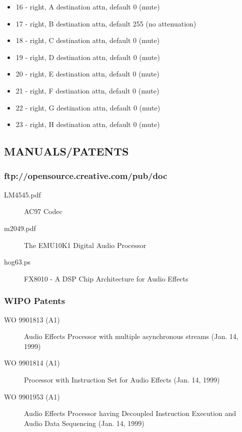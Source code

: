 \documentclass[a4paper,8pt,english]{sphinxmanual}
\begin{document}
\begin{itemize}
\item {} 
16 - right, A destination attn, default 0 (mute)

\item {} 
17 - right, B destination attn, default 255 (no attenuation)

\item {} 
18 - right, C destination attn, default 0 (mute)

\item {} 
19 - right, D destination attn, default 0 (mute)

\item {} 
20 - right, E destination attn, default 0 (mute)

\item {} 
21 - right, F destination attn, default 0 (mute)

\item {} 
22 - right, G destination attn, default 0 (mute)

\item {} 
23 - right, H destination attn, default 0 (mute)

\end{itemize}


\subsection{MANUALS/PATENTS}
\label{sound/cards/audigy-mixer:manuals-patents}

\subsubsection{ftp://opensource.creative.com/pub/doc}
\label{sound/cards/audigy-mixer:ftp-opensource-creative-com-pub-doc}\begin{description}
\item[{LM4545.pdf}] \leavevmode
AC97 Codec

\item[{m2049.pdf}] \leavevmode
The EMU10K1 Digital Audio Processor

\item[{hog63.ps}] \leavevmode
FX8010 - A DSP Chip Architecture for Audio Effects

\end{description}


\subsubsection{WIPO Patents}
\label{sound/cards/audigy-mixer:wipo-patents}\begin{description}
\item[{WO 9901813 (A1)}] \leavevmode
Audio Effects Processor with multiple asynchronous streams
(Jan. 14, 1999)

\item[{WO 9901814 (A1)}] \leavevmode
Processor with Instruction Set for Audio Effects (Jan. 14, 1999)

\item[{WO 9901953 (A1)}] \leavevmode
Audio Effects Processor having Decoupled Instruction
Execution and Audio Data Sequencing (Jan. 14, 1999)

\end{description}
\end{document}

